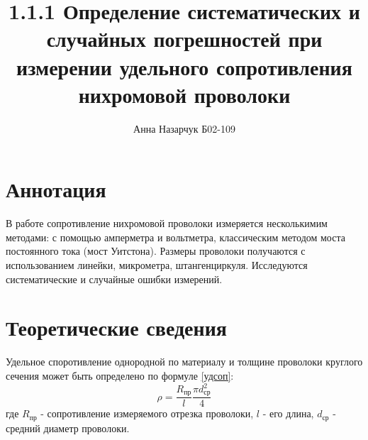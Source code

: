 \documentclass[a4paper,12pt]{article} %
\author{Анна Назарчук Б02-109}
\title{1.1.1 Определение систематических и случайных погрешностей при измерении удельного сопротивления нихромовой проволоки}
\date{}
\begin{document}
\maketitle

\section{Аннотация}
В работе сопротивление нихромовой проволоки измеряется несколькимим методами: с помощью амперметра и вольтметра, классическим методом моста постоянного тока (мост Уитстона). Размеры проволоки получаются с использованием линейки, микрометра, штангенциркуля. Исследуются систематические и случайные ошибки измерений.

\section{Теоретические сведения}
Удельное споротивление однородной по материалу и толщине проволоки круглого сечения может быть определено по формуле \ref{удсоп}:
\begin{equation}\label{удсоп}
\rho=\frac{R_{\text{пр}}}{l}\frac{\pi d_{\text{ср}}^2}{4}
\end{equation}
где $R_{\text{пр}}$ - сопротивление измеряемого отрезка проволоки, $l$ - его длина, $d_{\text{ср}}$ - средний диаметр проволоки.
\end{document}
